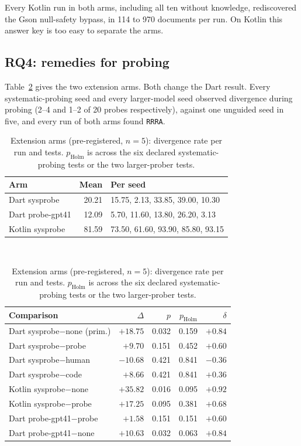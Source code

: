 Every Kotlin run in both arms, including all ten without knowledge,
rediscovered the Gson null-safety bypass, in 114 to 970 documents per run.
On Kotlin this answer key is too easy to separate the arms.

\subsection{RQ4: remedies for probing}

Table~\ref{tab:remedies} gives the two extension arms. Both change the
Dart result. Every systematic-probing seed and every larger-model seed
observed divergence during probing (2--4 and 1--2 of 20 probes
respectively), against one unguided seed in five, and every run of both
arms found \texttt{RRRA}.

\begin{table}[t]
\centering
\caption{Extension arms (pre-registered, $n{=}5$): divergence rate per run
and tests. $p_{\mathrm{Holm}}$ is across the six declared systematic-probing
tests or the two larger-prober tests.}
\label{tab:remedies}
\footnotesize
\begin{tabular}{@{}lrl@{}}
\toprule
Arm & Mean & Per seed \\
\midrule
Dart sysprobe     & 20.21 & 15.75, 2.13, 33.85, 39.00, 10.30 \\
Dart probe-gpt41  & 12.09 & 5.70, 11.60, 13.80, 26.20, 3.13 \\
Kotlin sysprobe   & 81.59 & 73.50, 61.60, 93.90, 85.80, 93.15 \\
\bottomrule
\end{tabular}\\[4pt]
\begin{tabular}{@{}lrrrr@{}}
\toprule
Comparison & $\Delta$ & $p$ & $p_{\mathrm{Holm}}$ & $\delta$ \\
\midrule
Dart sysprobe$-$none (prim.) & $+18.75$ & 0.032 & 0.159 & $+0.84$ \\
Dart sysprobe$-$probe          & $+9.70$  & 0.151 & 0.452 & $+0.60$ \\
Dart sysprobe$-$human          & $-10.68$ & 0.421 & 0.841 & $-0.36$ \\
Dart sysprobe$-$code           & $+8.66$  & 0.421 & 0.841 & $+0.36$ \\
Kotlin sysprobe$-$none         & $+35.82$ & 0.016 & 0.095 & $+0.92$ \\
Kotlin sysprobe$-$probe        & $+17.25$ & 0.095 & 0.381 & $+0.68$ \\
\midrule
Dart probe-gpt41$-$probe       & $+1.58$  & 0.151 & 0.151 & $+0.60$ \\
Dart probe-gpt41$-$none        & $+10.63$ & 0.032 & 0.063 & $+0.84$ \\
\bottomrule
\end{tabular}
\end{table}

